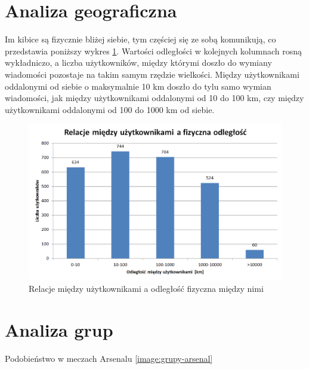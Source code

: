\clearpage
\section{Analiza geograficzna}
\label{section:analizageograficzna}

Im kibice są fizycznie bliżej siebie, tym częściej się ze sobą komunikują, 
co przedstawia poniższy wykres \ref{image:relacje-a-odleglosc}.
Wartości odległości w kolejnych kolumnach rosną wykładniczo,
a liczba użytkowników, między którymi doszło do wymiany wiadomości
pozostaje na takim samym rzędzie wielkości. Między użytkownikami oddalonymi
od siebie o maksymalnie 10 km doszło do tylu samo wymian wiadomości,
jak między użytkownikami oddalonymi od 10 do 100 km, czy między użytkownikami
oddalonymi od 100 do 1000 km od siebie.

\begin{figure}[ht!]
\centering
\includegraphics[width=120mm]{img/relacje-a-odleglosc.png}
\caption{Relacje między użytkownikami a odległość fizyczna między nimi}
\label{image:relacje-a-odleglosc}
\end{figure}









\clearpage
\section{Analiza grup}
\label{section:analizagrup}
Podobieństwo w meczach Arsenalu \ref{image:grupy-arsenal}
 

